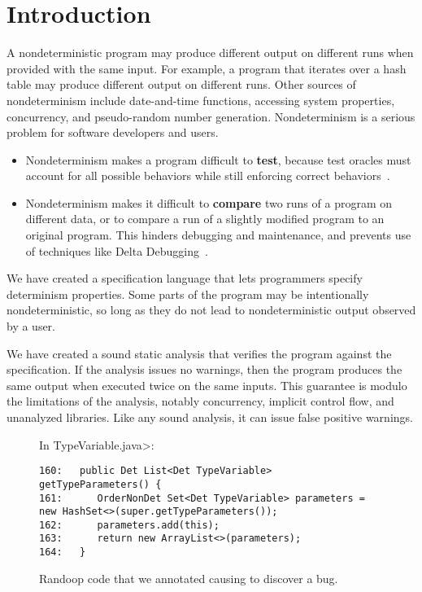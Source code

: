 \section{Introduction\label{sec:introduction}}

A nondeterministic program may produce different output on different runs
when provided with the same input.
For example, a program that iterates over a hash table
may produce different output on different runs.
Other sources of nondeterminism include
date-and-time functions,
accessing system properties,
concurrency,
and pseudo-random number generation.
%
Nondeterminism is a serious problem for software developers and users.
\begin{itemize}
\item
  Nondeterminism makes a program difficult to \textbf{test}, because test
  oracles must account for all possible behaviors while still enforcing
  correct behaviors~\cite{LuoHEM2014,ShiGLM2016,BellLHEYM2018,Sudarshan}.
\item
  Nondeterminism makes it difficult to \textbf{compare} two runs of a
  program on different data, or to compare a run of a slightly modified
  program to an original program.  This hinders debugging and maintenance,
  and prevents use of techniques like Delta Debugging~\cite{Zeller1999,YuLCZ2012}.
\end{itemize}


We have created a specification language that lets programmers specify
determinism properties.
Some parts of the program may be intentionally nondeterministic, so long
as they do not lead to nondeterministic output observed by a user.  

We have created a sound static analysis that verifies the program against the specification.
If the analysis issues no warnings, then the program produces the same
output when executed twice on the same inputs.  This guarantee is modulo
the limitations of the
analysis, notably 
concurrency, implicit control flow, and unanalyzed libraries.
Like any
sound analysis, it can issue false positive warnings.

\begin{figure*}

\noindent
In \<TypeVariable.java>:

\begin{Verbatim}
160:   public Det List<Det TypeVariable> getTypeParameters() {
161:      OrderNonDet Set<Det TypeVariable> parameters = new HashSet<>(super.getTypeParameters());
162:      parameters.add(this);
163:      return new ArrayList<>(parameters);
164:   }
\end{Verbatim}

\caption{Randoop code that we annotated causing \theDeterminismChecker to discover a bug.}
\label{fig:randoop-bug-hashset}
\vspace{-0.4cm}
\end{figure*}


